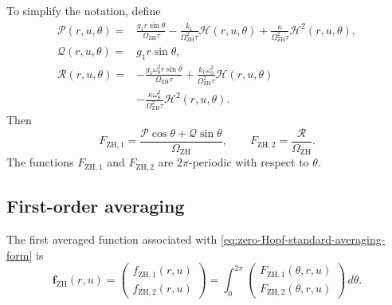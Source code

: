 \documentclass[11pt,reqno]{amsart}
\theoremstyle{plain}
\theoremstyle{definition}
\theoremstyle{remark}
\begin{document}
To simplify the notation, define
\begin{equation}
\label{eq:zero-Hopf-PQR}
\begin{aligned}
\mathcal P(r,u,\theta)
={}&
\frac{
g_1r\sin\theta
}{
\Omega_{\mathrm{ZH}}\tau
}
-
\frac{k_1}
{\Omega_{\mathrm{ZH}}^2\tau}
\mathcal H(r,u,\theta)
+
\frac{\kappa}
{\Omega_{\mathrm{ZH}}^2\tau}
\mathcal H^2(r,u,\theta),
\\[2mm]
\mathcal Q(r,u,\theta)
={}&
g_1r\sin\theta,
\\[2mm]
\mathcal R(r,u,\theta)
={}&
-\frac{
g_1\omega_0^2r\sin\theta
}{
\Omega_{\mathrm{ZH}}\tau
}
+
\frac{
k_1\omega_0^2
}{
\Omega_{\mathrm{ZH}}^2\tau
}
\mathcal H(r,u,\theta)
\\
&-
\frac{
\kappa\omega_0^2
}{
\Omega_{\mathrm{ZH}}^2\tau
}
\mathcal H^2(r,u,\theta).
\end{aligned}
\end{equation}
Then
\begin{equation}
\label{eq:zero-Hopf-F-components}
F_{\mathrm{ZH},1}
=
\frac{
\mathcal P\cos\theta+\mathcal Q\sin\theta
}{
\Omega_{\mathrm{ZH}}
},
\qquad
F_{\mathrm{ZH},2}
=
\frac{
\mathcal R
}{
\Omega_{\mathrm{ZH}}
}.
\end{equation}
The functions \(F_{\mathrm{ZH},1}\) and \(F_{\mathrm{ZH},2}\) are
\(2\pi\)-periodic with respect to \(\theta\).

\subsection{First-order averaging}
\label{subsec:zero-Hopf-first-order-averaging}

The first averaged function associated with
\eqref{eq:zero-Hopf-standard-averaging-form} is
\begin{equation}
\label{eq:zero-Hopf-first-averaged-definition}
\mathbf f_{\mathrm{ZH}}(r,u)
=
\begin{pmatrix}
f_{\mathrm{ZH},1}(r,u)\\[2mm]
f_{\mathrm{ZH},2}(r,u)
\end{pmatrix}
=
\int_0^{2\pi}
\begin{pmatrix}
F_{\mathrm{ZH},1}(\theta,r,u)\\[2mm]
F_{\mathrm{ZH},2}(\theta,r,u)
\end{pmatrix}
\,d\theta.
\end{equation}
\end{document}
